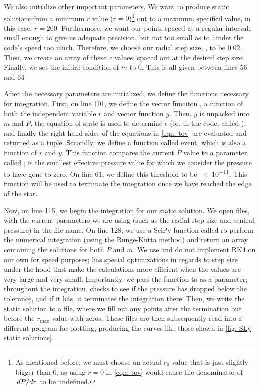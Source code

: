 We also initialize other important parameters. We want to produce static solutions from a minimum $r$ value ($r=0$)\footnote{As mentioned before, we must choose an actual $r_0$ value that is just slightly bigger than 0, as using $r=0$ in \eqref{eqn: tov} would cause the denominator of $\dv*{P}{r}$ to be undefined.} out to a maximum specified value, in this case, $r=200$. Furthermore, we want our points spaced at a regular interval, small enough to give us adequate precision, but not too small as to hinder the code's speed too much. Therefore, we choose our radial step size, , to be $0.02$. Then, we create an array of these $r$ values, spaced out at the desired step size. Finally, we set the initial condition of $m$ to 0. This is all given between lines 56 and 64

After the necessary parameters are initialized, we define the functions necessary for integration. First, on line 101, we define the vector funciton , a function of both the independent variable $r$ and vector function $y$. Then, $y$ is unpacked into $m$ and $P$, the equation of state is used to determine $\epsilon$ (or, in the code, called ), and finally the right-hand sides of the equations in \eqref{eqn: tov} are evaluated and returned as a tuple. Secondly, we define a function called event, which is also a function of $r$ and $y$. This function compares the current $P$ value to a parameter called ;  is the smallest effective pressure value for which we consider the pressure to have gone to zero. On line 61, we define this threshold to be \SI{e-11}{}. This function will be used to terminate the integration once we have reached the edge of the star.

Now, on line 115, we begin the integration for our static solution. We open files, with the current parameters we are using (such as the radial step size and central pressure) in the file name. On line 128, we use a SciPy function called  ro perform the numerical integration (using the Runge-Kutta method) and return an array containing the solutions for both $P$ and $m$. We use  and do not implement RK4 on our own for speed purposes;  has special optimizations in regards to step size under the hood that make the calculations more efficient when the values are very large and very small. Importantly, we pass the  function to  as a parameter; throughout the integration,  checks to see if the pressure has dropped below the tolerance, and if it has, it terminates the integration there. Then, we write the static solution to a file, where we fill out any points after the termination but before the $r_\text{max}$ value with zeros. These files are then subsequently read into a different program for plotting, producing the curves like those shown in \autoref{fig: SLy static solutions}.


